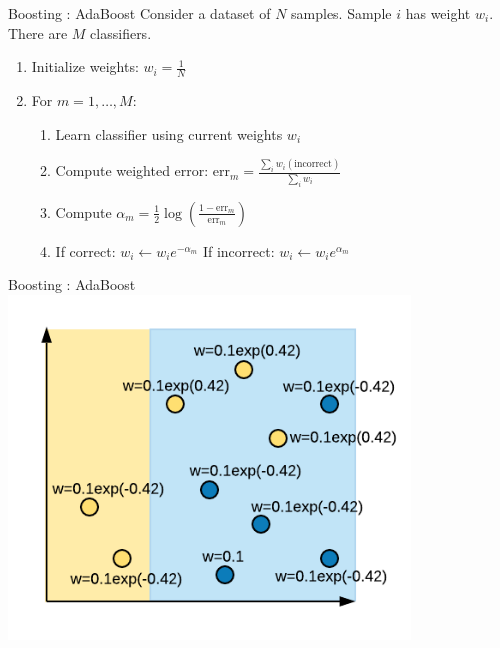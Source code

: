 \documentclass[aspectratio=169,10pt]{beamer}
\newcommand{\fitpic}[1]{\begin{adjustbox}{max width=\linewidth, max totalheight=0.78\textheight}#1\end{adjustbox}}
\begin{document}
\begin{frame}{Boosting : AdaBoost }
  Consider a dataset of $N$ samples. Sample $i$ has weight $w_i$. There are $M$ classifiers.\\[0.3cm]
  \begin{enumerate}
    \item Initialize weights: $w_i = \frac{1}{N}$
    \item For $m = 1, \ldots, M$:
          \begin{enumerate}
            \item Learn classifier using current weights $w_i$
            \item Compute weighted error: $\text{err}_m = \frac{\sum_i w_i(\text{incorrect})}{\sum_i w_i}$
            \item Compute $\alpha_m = \tfrac{1}{2}\log\!\left(\frac{1 - \text{err}_m}{\text{err}_m}\right)$
            \item If correct: $w_i \leftarrow w_i e^{-\alpha_m}$ \quad If incorrect: $w_i \leftarrow w_i e^{\alpha_m}$
          \end{enumerate}
  \end{enumerate}
\end{frame}

\begin{frame}{Boosting : AdaBoost }
  \centering
  \fitpic{\includegraphics[width=0.8\textwidth]{../assets/ensemble/diagrams/ada_iter1_new_weights_exp}}
\end{frame}
\end{document}
